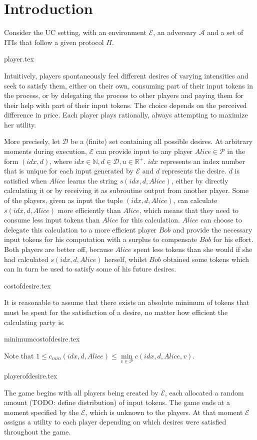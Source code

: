 \section{Introduction}
  Consider the UC setting, with an environment $\mathcal{E}$, an adversary $\mathcal{A}$ and a set of ITIs that follow a
  given protocol $\Pi$.

  {player.tex}

  Intuitively, players spontaneously feel different desires of varying intensities and seek to satisfy them, either on their
  own, consuming part of their input tokens in the process, or by delegating the process to other players and paying them for
  their help with part of their input tokens. The choice depends on the perceived difference in price. Each player plays
  rationally, always attempting to maximize her utility.
  
  More precisely, let $\mathcal{D}$ be a (finite) set containing all possible desires. At arbitrary moments during execution,
  $\mathcal{E}$ can provide input to any player $Alice \in \mathcal{P}$ in the form $\left(idx, d\right)$, where $idx \in
  \mathbb{N}, d \in \mathcal{D}, u \in \mathbb{R}^{+}$. $idx$ represents an index number that is unique for each input
  generated by $\mathcal{E}$ and $d$ represents the desire. $d$ is satisfied when $Alice$ learns the string $s\left(idx, d,
  Alice\right)$, either by directly calculating it or by receiving it as subroutine output from another player. Some of the
  players, given as input the tuple $\left(idx, d, Alice\right)$, can calculate $s\left(idx, d, Alice\right)$ more efficiently
  than $Alice$, which means that they need to consume less input tokens than $Alice$ for this calculation. $Alice$ can choose
  to delegate this calculation to a more efficient player $Bob$ and provide the necessary input tokens for his computation with
  a surplus to compensate $Bob$ for his effort. Both players are better off, because $Alice$ spent less tokens than she would
  if she had calculated $s\left(idx, d, Alice\right)$ herself, whilst $Bob$ obtained some tokens which can in turn be used to
  satisfy some of his future desires.

  {costofdesire.tex}

  It is reasonable to assume that there exists an absolute minimum of tokens that must be spent for the satisfaction of a
  desire, no matter how efficient the calculating party is.

  {minimumcostofdesire.tex}

  \noindent Note that $1 \leq c_{min}\left(idx, d, Alice\right) \leq \min\limits_{v \in \mathcal{P}}{c\left(idx, d, Alice,
  v\right)}$.

  {playerofdesire.tex}

  The game begins with all players being created by $\mathcal{E}$, each allocated a random amount (TODO: define distribution)
  of input tokens. The game ends at a moment specified by the $\mathcal{E}$, which is unknown to the players. At that moment
  $\mathcal{E}$ assigns a utility to each player depending on which desires were satisfied throughout the game.
